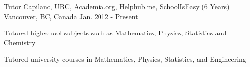 \begin{cventries}
  \cventry
    {Tutor} %
    {Capilano, UBC, Academia.org, Helphub.me, SchoolIsEasy (6 Years)} %
    {Vancouver, BC, Canada} %
    {Jan. 2012 - Present} %
    {
      \begin{cvitems} %
        \item {Tutored highschool subjects such as Mathematics, Physics, Statistics and Chemistry}
        \item {Tutored university courses in Mathematics, Physics, Statistics, and Engineering}
      \end{cvitems}
    }


\end{cventries}
